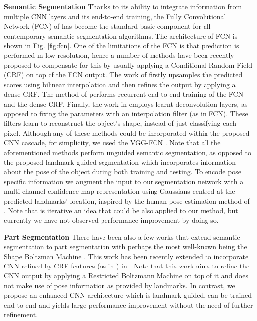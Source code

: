 \textbf{Semantic Segmentation} Thanks to its ability to integrate
information from multiple CNN layers and its end-to-end training, the
Fully Convolutional Network (FCN) of \cite{long2015fully} has become
the standard basic component for all contemporary semantic
segmentation algorithms. The architecture of FCN is shown in
Fig. \ref{fig:fcn}. One of the limitations of the FCN is that
prediction is performed in low-resolution, hence a number of methods
have been recently proposed to compensate for this by usually applying
a Conditional Random Field (CRF) on top of the FCN output. The work of
\cite{chen2015semantic} firstly upsamples the predicted scores using
bilinear interpolation and then refines the output by applying a dense
CRF. The method of \cite{zheng2015conditional} performs recurrent
end-to-end training of the FCN and the dense CRF. Finally, the work in
\cite{noh2015learning} employs learnt deconvolution layers, as opposed
to fixing the parameters with an interpolation filter (as in
FCN). These filters learn to reconstruct the object's shape, instead
of just classifying each pixel. Although any of these methods could be
incorporated within the proposed CNN cascade, for simplicity, we used
the VGG-FCN \cite{simonyan2014vgg}. Note that all the aforementioned
methods perform unguided semantic segmentation, as opposed to the
proposed landmark-guided segmentation which incorporates information
about the pose of the object during both training and testing. To
encode pose specific information we augment the input to our
segmentation network with a multi-channel confidence map
representation using Gaussians centred at the predicted landmarks'
location, inspired by the human pose estimation method of
\cite{carreira2016human}. Note that \cite{carreira2016human} is
iterative an idea that could be also applied to our method, but
currently we have not observed performance improvement by doing so.

\textbf{Part Segmentation} There have been also a few works that
extend semantic segmentation to part segmentation with perhaps the
most well-known being the Shape Boltzman Machine
\cite{eslami2012generative,eslami2014shape}. This work has been
recently extended to incorporate CNN refined by CRF features (as in
\cite{chen2015semantic}) in \cite{tsogkas2015deep}. Note that this
work aims to refine the CNN output by applying a Restricted Boltzmann
Machine on top of it and does not make use of pose information as
provided by landmarks. In contrast, we propose an enhanced CNN
architecture which is landmark-guided, can be trained end-to-end and
yields large performance improvement without the need of further
refinement.

